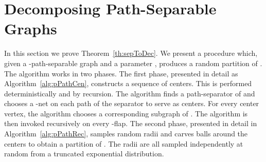 \documentclass[11pt,fleqn]{article}
\begin{document}
\section{Decomposing Path-Separable Graphs}
In this section we prove Theorem~\ref{th:sepToDec}. 
We present a procedure which, given a -path-separable graph  and a parameter , produces a random partition  of . 
The algorithm works in two phases. The first phase, presented in detail as Algorithm~\ref{alg:pPathCen}, constructs a sequence of centers.
This is performed deterministically and by recursion. 
The algorithm finds a path-separator  of  and chooses a -net on each path of the separator to serve as centers. For every center vertex, the algorithm chooses a corresponding subgraph of . 
The algorithm is then invoked recursively on every -flap.
The second phase, presented in detail in Algorithm~\ref{alg:pPathRec}, samples random radii and carves balls around the centers to obtain a partition of . The radii are all sampled independently at random from a truncated exponential distribution.
\end{document}
